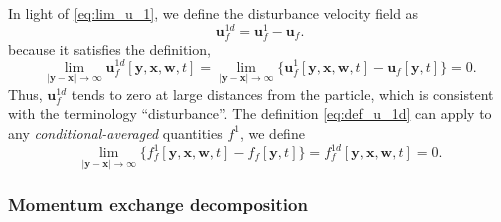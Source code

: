 In light of \ref{eq:lim_u_1}, we define the disturbance velocity field as 
\begin{equation}
    \textbf{u}_f^{1d}
    =
    \textbf{u}_f^1 
    - 
    \textbf{u}_f. 
    \label{eq:def_u_1d}
\end{equation}
because it satisfies the definition, 
\begin{equation}
    \lim_{|\textbf{y}-\textbf{x}|\to\infty} 
    \textbf{u}_f^{1d}[\textbf{y},\textbf{x},\textbf{w},t]
    =
    \lim_{|\textbf{y}-\textbf{x}|\to\infty} 
    \{\textbf{u}_f^1[\textbf{y},\textbf{x},\textbf{w},t]
    - \textbf{u}_f[\textbf{y},t]\}
    = 0.
    \label{eq:lim_u_1d}
\end{equation} 
Thus, $\textbf{u}_f^{1d}$ tends to zero at large distances from the particle, which is consistent with the terminology ``disturbance''.
The definition \ref{eq:def_u_1d} can apply to any \textit{conditional-averaged} quantities $f^1$, we define
\begin{equation}
    \lim_{|\textbf{y}-\textbf{x}|\to\infty} 
    \{f_f^1[\textbf{y},\textbf{x},\textbf{w},t]
    - f_f[\textbf{y},t]\}
    =
    f_f^{1d}[\textbf{y},\textbf{x},\textbf{w},t]
    = 0.
\end{equation} 

\subsubsection{Momentum exchange decomposition}

